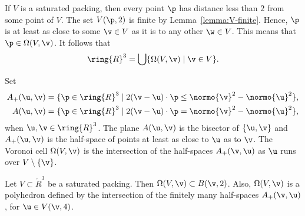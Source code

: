 \begin{remark}
  If $V$ is a saturated packing, then every point $\p$ has distance
  less than $2$ from some point of $V$.  The set $V(\p,2)$ is finite
  by Lemma~\ref{lemma:V-finite}.  Hence, $\p$ is at least as close to
  some $\v\in V$ as it is to any other $\w\in V$.  This means that
  $\p\in\Omega(V,\v)$.  It follows that
\begin{equation}\label{eqn:vor-rn}
\ring{R}^3 = \bigcup \{\Omega(V,\v)\mid \v \in V\}.
\end{equation}
\end{remark}

\begin{remark}
Set
\begin{eqnarray*}
A_+(\u,\v) &= \{\p\in\ring{R}^3
\mid 2(\v-\u)\cdot \p \le \normo{\v}^2 - \normo{\u}^2 \},\\
A(\u,\v) &= \{\p\in\ring{R}^3
\mid 2(\v-\u)\cdot \p = \normo{\v}^2 - \normo{\u}^2 \},\\
\end{eqnarray*}
when $\u,\v\in\ring{R}^3$.  The plane $A(\u,\v)$ is the bisector of
$\{\u,\v\}$ and $A_+(\u,\v)$ is the half-space of points at least as
close to $\u$ as to $\v$.  The Voronoi cell $\Omega(V,\v)$ is the
intersection of the half-spaces $A_+(\v,\u)$ as $\u$ runs over
$V\setminus \{\v\}$.
\end{remark}

\begin{lemma}\label{lemma:V4}
  Let $V\subset\ring{R}^3$ be a saturated packing.  Then
  $\Omega(V,\v)\subset B(\v,2)$.  Also, $\Omega(V,\v)$ is a polyhedron
  defined by the intersection of the finitely many half-spaces
  $A_+(\v,\u)$, for $\u\in V(\v,4)$.
\end{lemma}

